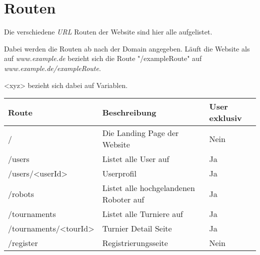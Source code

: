 \documentclass[Info_VK_Website_Dokumentation.tex]{subfiles}
\begin{document}
\chapter{Routen}

Die verschiedene \emph{URL} Routen der Website sind hier alle aufgelistet.

Dabei werden die Routen ab nach der Domain angegeben. Läuft die Website als auf \emph{www.example.de} bezieht sich die Route "/exampleRoute" auf \emph{www.example.de/exampleRoute}.

<xyz> bezieht sich dabei auf Variablen.

\begin{table}[H]
\centering
\begin{tabular}{ l | l | l }
\textbf{Route} & \textbf{Beschreibung} & \textbf{User exklusiv} \\
\hline
\hline
/       & Die Landing Page der Website & Nein \\
/users  & Listet alle User auf 		  & Ja \\
/users/<userId> & Userprofil & Ja \\ 
/robots & Listet alle hochgelandenen Roboter auf & Ja \\
/tournaments & Listet alle Turniere auf & Ja \\
/tournaments/<tourId> & Turnier Detail Seite  & Ja \\
/register & Registrierungsseite & Nein \\
\end{tabular} 
\end{table} 
\end{document}
